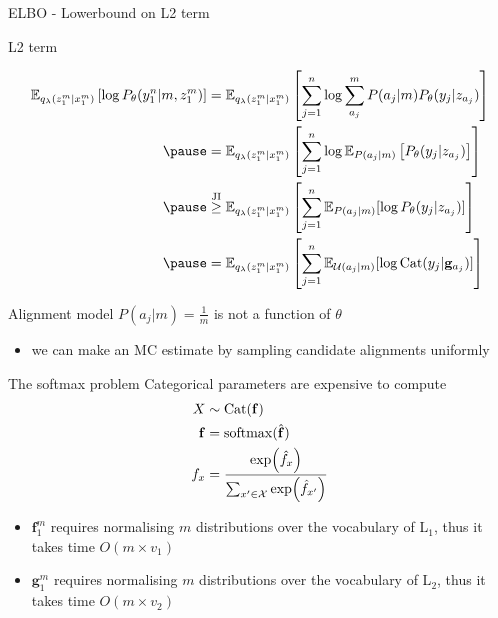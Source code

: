 \begin{frame}[plain]{ELBO - Lowerbound on L2 term}

L2 term
\begin{small}
\begin{equation*}
\begin{aligned}
\mathbb E_{q_\lambda(z_1^m|x_1^m)}\left[ \log P_\theta(y_1^n|m, z_1^m)\right] 
 &= \mathbb E_{q_\lambda(z_1^m|x_1^m)}\left[  \sum_{j=1}^n \log \sum_{a_j}^m P(a_j|m) P_\theta(y_j|z_{a_j}) \right]  \\  \pause
 &= \mathbb E_{q_\lambda(z_1^m|x_1^m)}\left[  \sum_{j=1}^n \log \mathbb E_{P(a_j|m)} \left[ P_\theta(y_j|z_{a_j}) \right] \right]  \\  \pause
&\overset{\text{JI}}{\ge} \mathbb E_{q_\lambda(z_1^m|x_1^m)}\left[  \sum_{j=1}^n \mathbb E_{P(a_j|m)} [\log P_\theta(y_j|z_{a_j}) ]\right]  \\  \pause
&= \mathbb E_{q_\lambda(z_1^m|x_1^m)}\left[  \sum_{j=1}^n \mathbb E_{\mathcal U(a_j|m)} [\log \Cat(y_j|\mathbf g_{a_j}) ]\right] 
\end{aligned}
\end{equation*}
\end{small}

\pause

Alignment model $P(a_j|m)=\frac{1}{m}$ is not a function of $\theta$
\begin{itemize}
	\item we can make an MC estimate by sampling candidate alignments uniformly
\end{itemize}


\end{frame}

\begin{frame}{The softmax problem}
Categorical parameters are expensive to compute 
\begin{equation*}
\begin{aligned}
X &\sim \operatorname{Cat}(\mathbf f)\\
\mathbf f &= \operatorname{softmax} (\hat{\mathbf f}) \\
f_{x} &= \frac{\exp(\hat f_x)}{\sum_{x' \in \mathcal X} \exp(\hat f_{x'})}
\end{aligned}
\end{equation*}

\pause

\begin{itemize}
	\item $\mathbf f_1^m$ requires normalising $m$ distributions over the vocabulary of L$_1$, thus it takes time $O(m \times v_1)$
	\item $\mathbf g_1^m$ requires normalising $m$ distributions over the vocabulary of L$_2$, thus it takes time $O(m \times v_2)$
\end{itemize}


\end{frame}

